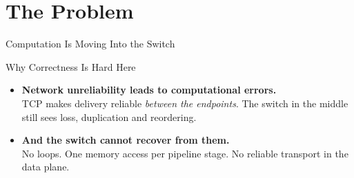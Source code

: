 \section{The Problem}

\begin{frame}{Computation Is Moving Into the Switch}
  \vspace{0.2em}
  \begin{center}\incconcept\end{center}
  \vspace{0.1em}
\end{frame}

\begin{frame}{Why Correctness Is Hard Here}
  \vspace{0.6em}
  \begin{itemize}
    \item[] \textbf{Network unreliability leads to computational errors.}\\
            TCP makes delivery reliable \emph{between the endpoints}.
            The switch in the middle still sees loss, duplication and reordering.
    \vspace{1.0em}
    \item[]<2-> \textbf{And the switch cannot recover from them.}\\
            No loops. One memory access per pipeline stage.
            No reliable transport in the data plane.
  \end{itemize}
  \vspace{1.2em}
\end{frame}

